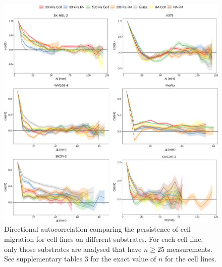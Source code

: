 \documentclass[11pt,letterpaper,english,oneside]{article} %
\begin{document}
\begin{figure}[H]
    \hspace*{-0.8cm}
    \centering
    \includegraphics{../Figures/Supplementary_Figures17_21/supplementary_figure17.png}
    \caption{Directional autocorrelation comparing the persistence of cell migration for cell lines on different substrates.
    For each cell line, only those substrates are analysed that have $n \geq 25$ measurements.
    See supplementary tables 3 for the exact value of $n$ for the cell lines.}
    \label{fig:fig17}
\end{figure}
\end{document}
